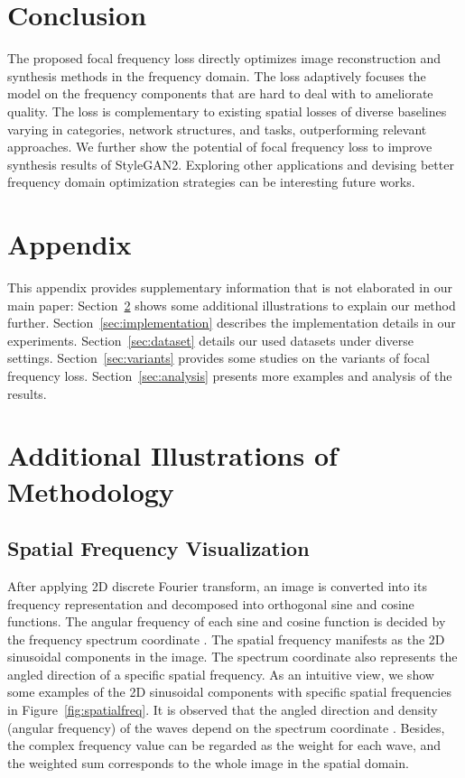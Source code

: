 \documentclass[10pt,twocolumn,letterpaper]{article}
\begin{document}
 

\section{Conclusion}
\label{sec:discussion}

The proposed focal frequency loss directly optimizes image reconstruction and synthesis methods in the frequency domain.
The loss adaptively focuses the model on the frequency components that are hard to deal with to ameliorate quality.
The loss is complementary to existing spatial losses of diverse baselines varying in categories, network structures, and tasks, outperforming relevant approaches.
We further show the potential of focal frequency loss to improve synthesis results of StyleGAN2.
Exploring other applications and devising better frequency domain optimization strategies can be interesting future works.

 
{\small


}



\clearpage
\section*{Appendix}
\label{sec:appendix}
This appendix provides supplementary information that is not elaborated in our main paper:
Section~\ref{sec:addimethodillus} shows some additional illustrations to explain our method further.
Section~\ref{sec:implementation} describes the implementation details in our experiments.
Section~\ref{sec:dataset} details our used datasets under diverse settings.
Section~\ref{sec:variants} provides some studies on the variants of focal frequency loss.
Section~\ref{sec:analysis} presents more examples and analysis of the results.


\appendix
\section{Additional Illustrations of Methodology}
\label{sec:addimethodillus}


\subsection{Spatial Frequency Visualization}
\label{sec:spatialfreqvis}
After applying 2D discrete Fourier transform, an image is converted into its frequency representation and decomposed into orthogonal sine and cosine functions.
The angular frequency of each sine and cosine function is decided by the frequency spectrum coordinate .
The spatial frequency manifests as the 2D sinusoidal components in the image.
The spectrum coordinate also represents the angled direction of a specific spatial frequency.
As an intuitive view, we show some examples of the 2D sinusoidal components with specific spatial frequencies in Figure~\ref{fig:spatialfreq}.
It is observed that the angled direction and density (angular frequency) of the waves depend on the spectrum coordinate .
Besides, the complex frequency value  can be regarded as the weight for each wave, and the weighted sum corresponds to the whole image in the spatial domain.
\end{document}
